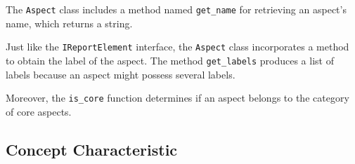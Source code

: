 The \texttt{Aspect} class includes a method named \texttt{get\_name} for retrieving an aspect's name,
which returns a string.


Just like the \texttt{IReportElement} interface, the \texttt{Aspect} class incorporates a method to obtain the label of the aspect.
The method \texttt{get\_labels} produces a list of labels because an aspect might possess several labels.

Moreover, the \texttt{is\_core} function determines if an aspect belongs to the category of core aspects.



\subsection{Concept Characteristic}

